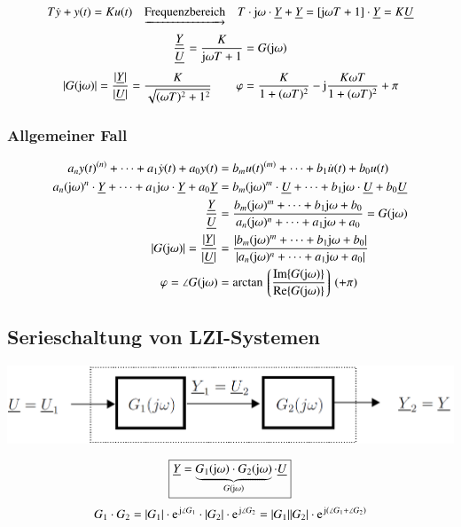 
\vspace{-0.3cm} %
$$ T \dot{y} + y(t) = K u(t) \quad \underrightarrow{\text{Frequenzbereich}} \quad 
T \cdot \mathrm{j} \omega \cdot \underline{Y} + \underline{Y} = [\mathrm{j} \omega T + 1] \cdot \underline{Y} = K \underline{U} $$
$$ \frac{\underline{Y}}{\underline{U}} = \frac{K}{\mathrm{j} \omega T + 1} = G(\mathrm{j} \omega) $$
$$ |G(\mathrm{j} \omega)| = \frac{|\underline{Y}|}{|\underline{U}|} = \frac{K}{\sqrt{(\omega T)^2 + 1^2}} \qquad \varphi = \frac{K}{1 + (\omega T)^2} - \mathrm{j} \frac{K \omega T}{1 + (\omega T)^2 } + \pi $$


\subsubsection{Allgemeiner Fall}


\vspace{-0.5cm} %
\begin{align*}
    a_n y(t)^{(n)} + \cdots  + a_1 \dot{y}(t) + a_0 y(t) &= b_m u(t)^{(m)} + \cdots + b_1 \dot{u}(t) + b_0 u(t) \\
    a_n (\mathrm{j} \omega)^n \cdot \underline{Y} + \cdots + a_1 \mathrm{j} \omega \cdot \underline{Y} + a_0 \underline{Y} 
    &=  b_m (\mathrm{j} \omega)^m \cdot \underline{U} + \cdots + b_1 \mathrm{j} \omega \cdot \underline{U} + b_0 \underline{U} \\
    \frac{\underline{Y}}{\underline{U}} 
    &= \frac{b_m (\mathrm{j} \omega)^m + \cdots + b_1 \mathrm{j} \omega + b_0}{a_n (\mathrm{j} \omega)^n + \cdots + a_1 \mathrm{j} \omega + a_0} = G(\mathrm{j} \omega) \\
    |G(\mathrm{j} \omega)| = \frac{|\underline{Y}|}{|\underline{U}|}
    &= \frac{| b_m (\mathrm{j} \omega)^m + \cdots + b_1 \mathrm{j} \omega + b_0 |}{| a_n (\mathrm{j} \omega)^n + \cdots + a_1 \mathrm{j} \omega + a_0 |} \\
    \varphi = \angle G(\mathrm{j} \omega) &= \arctan \left\lgroup \frac{\mathrm{Im} \{G(\mathrm{j} \omega)\}}{\mathrm{Re}\{G(\mathrm{j} \omega)\}} \right\rgroup (+ \pi)
\end{align*}




\subsection{Serieschaltung von LZI-Systemen}

\begin{center}
    \includegraphics[width=0.7\columnwidth]{images/frequenzgang_serieschaltung.png}
\end{center}
$$ \boxed{ \underline{Y} = \underbrace{G_1(\mathrm{j} \omega) \cdot G_2(\mathrm{j} \omega)}_{G(\mathrm{j} \omega)} \cdot \underline{U} } $$
$$ G_1 \cdot G_2 = |G_1| \cdot \e^{\jimg \angle G_1} \cdot |G_2| \cdot \e^{\jimg \angle G_2} = |G_1| |G_2| \cdot \e^{\jimg (\angle G_1 + \angle G_2)} $$


